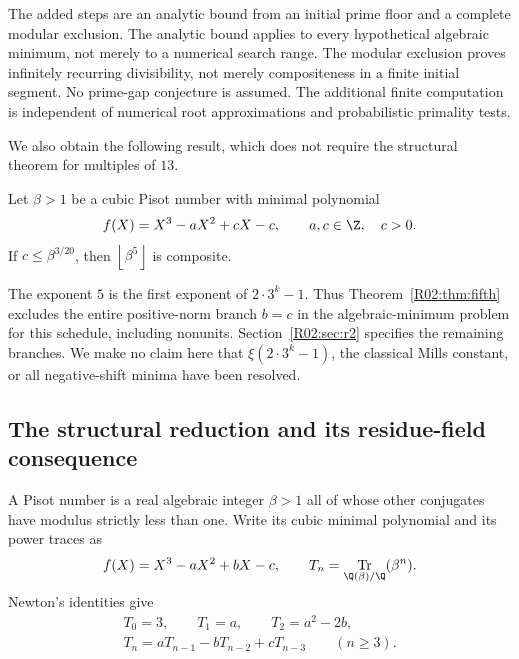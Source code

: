 \documentclass[11pt,a4paper]{article}
\theoremstyle{definition}\newtheorem{definition}[theorem]{Definition}
\theoremstyle{remark}\newtheorem{remark}[theorem]{Remark}
\newcommand{\floor}[1]{\left\lfloor#1\right\rfloor}
\DeclareMathOperator{\Tr}{Tr}\DeclareMathOperator{\tr}{tr}\DeclareMathOperator{\Nm}{N}
\begin{document}
The added steps are an analytic bound from an initial prime floor and a
complete modular exclusion. The analytic bound applies to every
hypothetical algebraic minimum, not merely to a numerical search
range. The modular exclusion proves infinitely recurring divisibility,
not merely compositeness in a finite initial segment. No prime-gap
conjecture is assumed. The additional finite computation is independent
of numerical root approximations and probabilistic primality tests.

We also obtain the following result, which does not require the
structural theorem for multiples of $13$.

\begin{mainthm}\label{R02:thm:fifth}
Let $\beta>1$ be a cubic Pisot number with minimal polynomial
\[
 f(X)=X^3-aX^2+cX-c,\qquad a,c\in\Z,\quad c>0.
\]
If $c\le\beta^{3/20}$, then $\floor{\beta^5}$ is composite.
\end{mainthm}

The exponent $5$ is the first exponent of $2\cdot3^k-1$.
Thus Theorem~\ref{R02:thm:fifth} excludes the entire positive-norm branch
$b=c$ in the algebraic-minimum problem for this schedule, including
nonunits. Section~\ref{R02:sec:r2} specifies the remaining branches. We
make no claim here that $\xi(2\cdot3^k-1)$, the classical Mills
constant, or all negative-shift minima have been resolved.

\subsection{The structural reduction and its residue-field consequence}
\label{R02:sec:reduction}

A Pisot number is a real algebraic integer $\beta>1$ all of whose other
conjugates have modulus strictly less than one. Write its cubic minimal
polynomial and its power traces as
\begin{equation}\label{R02:eq:poly}
 f(X)=X^3-aX^2+bX-c,\qquad
 T_n=\Tr_{\Q(\beta)/\Q}(\beta^n).
\end{equation}
Newton's identities give
\begin{equation}\label{R02:eq:recurrence}
 \begin{gathered}
 T_0=3,\qquad T_1=a,\qquad T_2=a^2-2b,\\
 T_n=aT_{n-1}-bT_{n-2}+cT_{n-3}\qquad(n\ge3).
 \end{gathered}
\end{equation}
\end{document}
